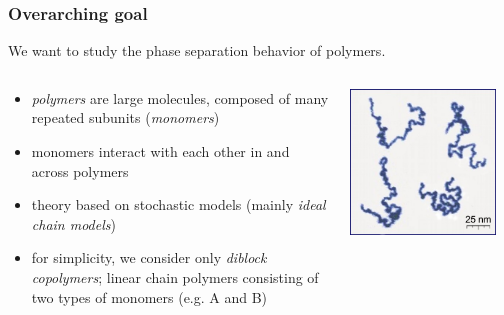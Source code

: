 \begin{frame}
        \titlepage
\end{frame}

\begin{frame}[t]
    \frametitle{Overarching goal}
    We want to study the phase separation behavior of polymers.
    \vfill

    \begin{columns}
        \begin{column}{0.6\textwidth}
            \begin{itemize}
                \item<2-> \emph{polymers} are large molecules, composed of many repeated subunits (\emph{monomers})
                \item<2-> monomers interact with each other in and across polymers
                \item<2-> theory based on stochastic models (mainly \emph{ideal chain models})
                \item<3-> for simplicity, we consider only \emph{diblock copolymers}; linear chain polymers consisting of two types of monomers (e.g. A and B)
            \end{itemize}
        \end{column}
        \begin{column}{0.4\textwidth}
            \centering
            \includegraphics[width=0.9\textwidth]{figures/Single_Polymer_Chains_AFM.jpg}

\end{column}
\end{columns}
\end{frame}
